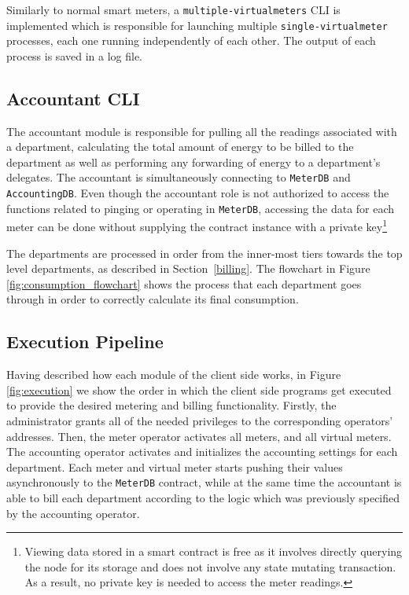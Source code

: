 Similarly to normal smart meters, a \texttt{multiple-virtualmeters} CLI is implemented which is responsible for launching multiple \texttt{single-virtualmeter} processes, each one running independently of each other. The output of each process is saved in a log file.

\subsection{Accountant CLI}
The accountant module is responsible for pulling all the readings associated with a department, calculating the total amount of energy to be billed to the department as well as performing any forwarding of energy to a department's delegates. The accountant is simultaneously connecting to \texttt{MeterDB} and \texttt{AccountingDB}. Even though the accountant role is not authorized to access the functions related to pinging or operating in \texttt{MeterDB}, accessing the data for each meter can be done without supplying the contract instance with a private key\footnote{Viewing data stored in a smart contract is free as it involves directly querying the node for its storage and does not involve any state mutating transaction. As a result, no private key is needed to access the meter readings.} 

The departments are processed in order from the inner-most tiers towards the top level departments, as described in Section~\ref{billing}. The flowchart in Figure \ref{fig:consumption_flowchart} shows the process that each department goes through in order to correctly calculate its final consumption.



\subsection{Execution Pipeline} \label{execution}

Having described how each module of the client side works, in Figure \ref{fig:execution} we show the order in which the client side programs get executed to provide the desired metering and billing functionality. Firstly, the administrator grants all of the needed privileges to the corresponding operators' addresses. Then, the meter operator activates all meters, and all virtual meters. The accounting operator activates and initializes the accounting settings for each department. Each meter and virtual meter starts pushing their values asynchronously to the \texttt{MeterDB} contract, while at the same time the accountant is able to bill each department according to the logic which was previously specified by the accounting operator.


